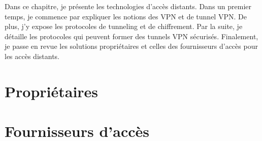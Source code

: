 Dans ce chapitre, je présente les technologies d'accès distants.
Dans un premier temps, je commence par expliquer les notions des VPN et de tunnel VPN. 
De plus, j'y expose les protocoles de tunneling et de chiffrement.
Par la suite, je détaille les protocoles qui peuvent former des tunnels VPN sécurisés. 
Finalement, je passe en revue les solutions propriétaires et celles des fournisseurs d'accès pour les accès distants.







\section{Propriétaires}

\section{Fournisseurs d'accès}
